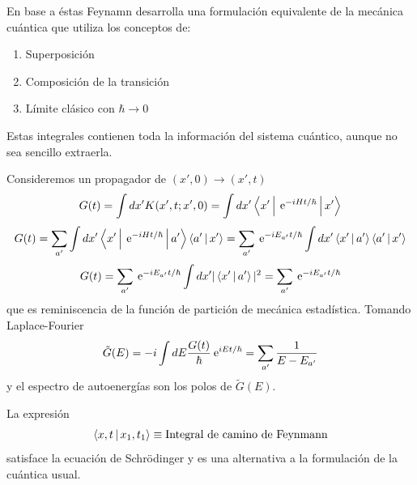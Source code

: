 \documentclass[10pt,oneside]{CBFT_book}
\begin{document}
En base a éstas Feynamn desarrolla una formulación equivalente de la mecánica cuántica que utiliza los 
conceptos de:
\begin{enumerate}
 \item Superposición
 \item Composición de la transición
 \item Límite clásico con $\hbar \to 0$
\end{enumerate}

Estas integrales contienen toda la información del sistema cuántico, aunque no sea sencillo extraerla.

Consideremos un propagador de $(x',0) \to (x',t)$
\[
	G(t) = \int dx' K(x',t ; x', 0) = \int dx' \Braket{x'|\:\mathrm{e}^{-i Ht/\hbar}|x'}
\]
\[
	G(t) = \sum_{a'} \int dx' \Braket{x'|\:\mathrm{e}^{-i Ht/\hbar}|a'}\Braket{a'|x'} =
		\sum_{a'} \:\mathrm{e}^{-i E_{a'}t/\hbar} \int dx' \Braket{x'|a'}\Braket{a'|x' }
\]
\[
	G(t) = \sum_{a'} \:\mathrm{e}^{-i E_{a'}t/\hbar} \int dx' |\Braket{x'|a'}|^2 = \sum_{a'} \:\mathrm{e}^{-i E_{a'}t/\hbar} 
\]
que es reminiscencia de la función de partición de mecánica estadística. Tomando Laplace-Fourier 
\[
	\tilde{G}(E) = -i \int dE \frac{G(t)}{\hbar} \:\mathrm{e}^{i E t/\hbar} = \sum_{a'} \frac{1}{E-E_{a'}}
\]
y el espectro de autoenergías son los polos de $\tilde{G}(E)$.

La expresión 
\[
	\Braket{x,t|x_1,t_1} \equiv \text{Integral de camino de Feynmann}
\]
satisface la ecuación de Schrödinger y es una alternativa a la formulación de la cuántica usual.


\end{document}
